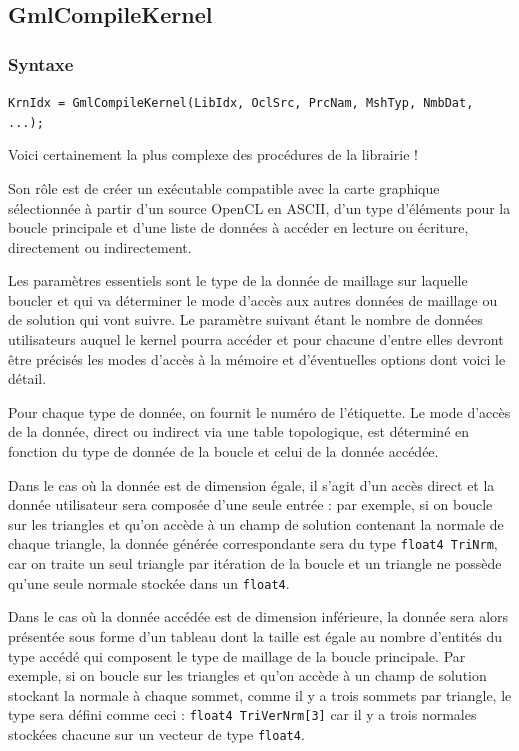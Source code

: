 \documentclass[a4paper,12pt]{article}
\begin{document}
\subsection{GmlCompileKernel}

\subsubsection*{Syntaxe}

{\tt KrnIdx = GmlCompileKernel(LibIdx, OclSrc, PrcNam, MshTyp, NmbDat, ...);}

Voici certainement la plus complexe des procédures de la librairie !

Son rôle est de créer un exécutable compatible avec la carte graphique sélectionnée à partir d'un source OpenCL en ASCII, d'un type d’éléments pour la boucle principale et d'une liste de données à accéder en lecture ou écriture, directement ou indirectement.

Les paramètres essentiels sont le type de la donnée de maillage sur laquelle boucler et qui va déterminer le mode d'accès aux autres données de maillage ou de solution qui vont suivre.
Le paramètre suivant étant le nombre de données utilisateurs auquel le kernel pourra accéder et pour chacune d'entre elles devront être précisés les modes d'accès à la mémoire et d'éventuelles options dont voici le détail.

Pour chaque type de donnée, on fournit le numéro de l'étiquette.
Le mode d'accès de la donnée, direct ou indirect via une table topologique, est déterminé en fonction du type de donnée de la boucle et celui de la donnée accédée.

Dans le cas où la donnée est de dimension égale, il s'agit d'un accès direct et la donnée utilisateur sera composée d'une seule entrée : par exemple, si on boucle sur les triangles et qu'on accède à un champ de solution contenant la normale de chaque triangle, la donnée générée correspondante sera du type {\tt float4 TriNrm}, car on traite un seul triangle par itération de la boucle et un triangle ne possède qu'une seule normale stockée dans un {\tt float4}.

Dans le cas où la donnée accédée est de dimension inférieure, la donnée sera alors présentée sous forme d'un tableau dont la taille est égale au nombre d'entités du type accédé qui composent le type de maillage de la boucle principale. Par exemple, si on boucle sur les triangles et qu'on accède à un champ de solution stockant la normale à chaque sommet, comme il y a trois sommets par triangle, le type sera défini comme ceci : {\tt float4 TriVerNrm[3]} car il y a trois normales stockées chacune sur un vecteur de type {\tt float4}.
\end{document}

